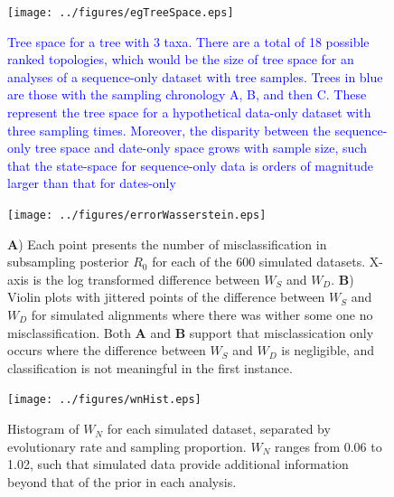 \documentclass{article}
\begin{document}
\begin{figure}[H]
\centering
\texttt{[image: ../figures/egTreeSpace.eps]}
\caption{\textcolor{blue}{Tree space for a tree with 3 taxa. There are a total of 18 possible ranked topologies, which would be the size of tree space for an analyses of a sequence-only dataset with tree samples. Trees in blue are those with the sampling chronology A, B, and then C. These represent the tree space for a hypothetical data-only dataset with three sampling times. Moreover, the disparity between the sequence-only tree space and date-only space grows with sample size, such that the state-space for sequence-only data is orders of magnitude larger than that for dates-only}}
\label{fig:treeSpace}
\end{figure}


\begin{figure}[H]
\centering
\texttt{[image: ../figures/errorWasserstein.eps]}
\caption{ \textbf{A}) Each point presents the number of misclassification in subsampling posterior $R_0$ for each of the 600 simulated datasets. X-axis is the log transformed difference between $W_S$ and $W_D$. \textbf{B}) Violin plots with jittered points of the difference between $W_S$ and $W_D$ for simulated alignments where there was wither some one no misclassification. Both \textbf{A} and \textbf{B} support that misclassication only occurs where the difference between $W_S$ and $W_D$ is negligible, and classification is not meaningful in the first instance.}
\label{fig:validateW}
\end{figure}

\begin{figure}[H]
\centering
\texttt{[image: ../figures/wnHist.eps]}
\caption{Histogram of $W_N$ for each simulated dataset, separated by evolutionary rate and sampling proportion. $W_N$ ranges from 0.06 to 1.02, such that simulated data provide additional information beyond that of the prior in each analysis.}
\label{fig:wnHist}
\end{figure}
\end{document}
